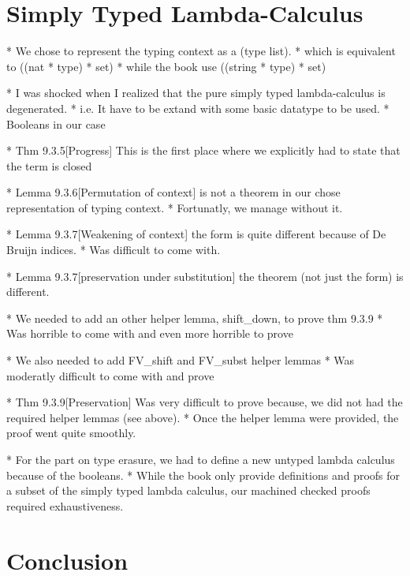 \documentclass[a4paper, oneside, 12pt, titlepage]{article}
\begin{document}
\section{Simply Typed Lambda-Calculus}
\label{sec:simply-typed-lambda-calculus}

  * We chose to represent the typing context as a (type list).
    * which is equivalent to ((nat * type) * set)
    * while the book use ((string * type) * set)

  * I was shocked when I realized that the pure simply typed lambda-calculus is degenerated.
    * i.e. It have to be extand with some basic datatype to be used.
    * Booleans in our case

  * Thm 9.3.5[Progress] This is the first place where we explicitly had to state that the term is
    closed

  * Lemma 9.3.6[Permutation of context] is not a theorem in our chose representation of typing
    context.
    * Fortunatly, we manage without it.

  * Lemma 9.3.7[Weakening of context] the form is quite different because of De Bruijn indices.
    * Was difficult to come with.

  * Lemma 9.3.7[preservation under substitution] the theorem (not just the form) is different.

  * We needed to add an other helper lemma, shift\_down, to prove thm 9.3.9
    * Was horrible to come with and even more horrible to prove

  * We also needed to add FV\_shift and FV\_subst helper lemmas
    * Was moderatly difficult to come with and prove

  * Thm 9.3.9[Preservation] Was very difficult to prove because, we did not had the required helper
    lemmas (see above).
    * Once the helper lemma were provided, the proof went quite smoothly.

  * For the part on type erasure, we had to define a new untyped lambda calculus because of the
    booleans.
    * While the book only provide definitions and proofs for a subset of the simply typed lambda
      calculus, our machined checked proofs required exhaustiveness.

\section{Conclusion}
\end{document}
